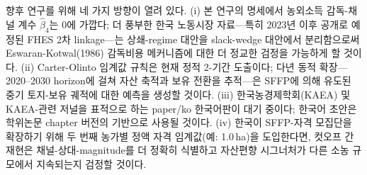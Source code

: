\documentclass[12pt, a4paper]{article}
\begin{document}
향후 연구를 위해 네 가지 방향이 열려 있다. (i) 본 연구의 명세에서 농외소득 감독-채널 계수 $\hat\beta_4$는 0에 가깝다; 더 풍부한 한국 노동시장 자료---특히 2023년 이후 공개로 예정된 FHES 2차 linkage---는 상쇄-regime 대안을 slack-wedge 대안에서 분리함으로써 Eswaran-Kotwal(1986) 감독비용 메커니즘에 대한 더 정교한 검정을 가능하게 할 것이다. (ii) Carter-Olinto 임계값 규칙은 현재 정적 2-기간 도출이다; 다년 동적 확장---2020--2030 horizon에 걸쳐 자산 축적과 보유 전환을 추적---은 SFFP에 의해 유도된 중기 토지-보유 궤적에 대한 예측을 생성할 것이다. (iii) 한국농경제학회(KAEA) 및 KAEA-관련 저널을 표적으로 하는 paper/ko 한국어판이 대기 중이다; 한국어 초안은 학위논문 chapter 버전의 기반으로 사용될 것이다. (iv) 한국이 SFFP-자격 모집단을 확장하기 위해 두 번째 농가별 정액 자격 임계값(예: 1.0\,ha)을 도입한다면, 컷오프 간 재현은 채널-상대-magnitude를 더 정확히 식별하고 자산편향 시그너처가 다른 소농 규모에서 지속되는지 검정할 것이다.



\end{document}
